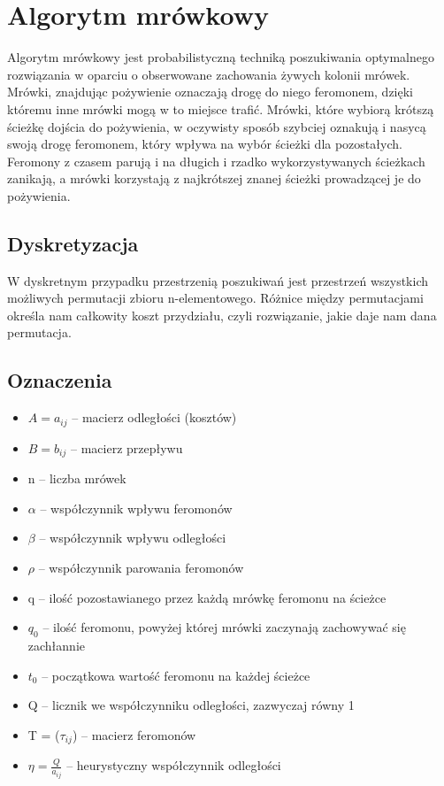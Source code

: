 \documentclass[12pt]{article}
\begin{document}

\section{Algorytm mrówkowy}
Algorytm mrówkowy jest probabilistyczną techniką poszukiwania optymalnego rozwiązania w oparciu o obserwowane zachowania żywych kolonii mrówek.
Mrówki, znajdując pożywienie oznaczają drogę do niego feromonem, dzięki któremu inne mrówki mogą w to miejsce trafić.
Mrówki, które wybiorą krótszą ścieżkę dojścia do pożywienia, w oczywisty sposób szybciej oznakują i nasycą swoją drogę feromonem, który wpływa na wybór ścieżki dla pozostałych.
Feromony z czasem parują i na długich i rzadko wykorzystywanych ścieżkach zanikają, a mrówki korzystają z najkrótszej znanej ścieżki prowadzącej je do pożywienia.
\subsection{Dyskretyzacja}
W dyskretnym przypadku przestrzenią poszukiwań jest przestrzeń wszystkich możliwych permutacji zbioru n-elementowego. Różnice między permutacjami określa nam całkowity koszt przydziału, czyli rozwiązanie, jakie daje nam dana permutacja.

\subsection{Oznaczenia}
\begin{itemize}
 \item $A = a_{ij}$ -- macierz odległości (kosztów)
 \item $B = b_{ij}$ -- macierz przepływu
 \item n -- liczba mrówek
 \item $\alpha$ -- współczynnik wpływu feromonów
 \item $\beta$ -- współczynnik wpływu odległości
 \item $\rho$ -- współczynnik parowania feromonów
 \item q -- ilość pozostawianego przez każdą mrówkę feromonu na ścieżce
 \item $q_0$ -- ilość feromonu, powyżej której mrówki zaczynają zachowywać się zachłannie
 \item $t_0$ -- początkowa wartość feromonu na każdej ścieżce
 \item Q -- licznik we współczynniku odległości, zazwyczaj równy 1
 \item T = ($\tau_{ij}$) -- macierz feromonów
 \item $\eta = \frac{Q}{a_{ij}}$ -- heurystyczny współczynnik odległości
\end{itemize}
\end{document}
